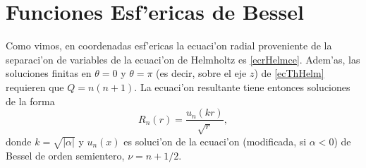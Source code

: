 \section{Funciones Esf'ericas de Bessel}
Como vimos, en coordenadas esf'ericas la ecuaci'on radial proveniente de la separaci'on de variables de la ecuaci'on de Helmholtz es \eqref{ecrHelmce}. Adem'as, las soluciones finitas en $\theta=0$ y $\theta=\pi$ (es decir, sobre el eje $z$) de \eqref{ecThHelm} requieren que $Q=n(n+1)$. La ecuaci'on resultante tiene entonces soluciones de la forma
\begin{equation}
R_n(r) = \frac{u_n(kr)}{\sqrt{r}} ,
\end{equation}
donde $k=\sqrt{|\alpha|}$ y $u_n(x)$ es soluci'on de la ecuaci'on (modificada, si $\alpha<0$) de Bessel de orden semientero, $\nu=n+1/2$.

